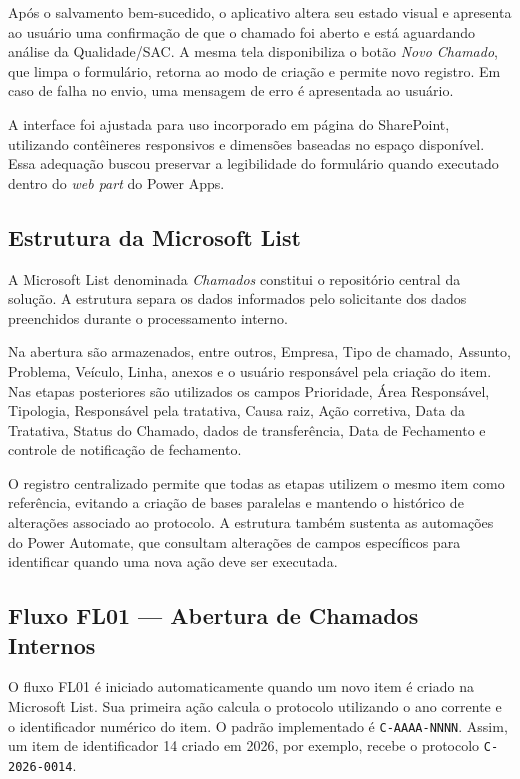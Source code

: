 Após o salvamento bem-sucedido, o aplicativo altera seu
estado visual e apresenta ao usuário uma confirmação de que
o chamado foi aberto e está aguardando análise da
Qualidade/SAC. A mesma tela disponibiliza o botão
\textit{Novo Chamado}, que limpa o formulário, retorna ao
modo de criação e permite novo registro. Em caso de falha
no envio, uma mensagem de erro é apresentada ao usuário.

A interface foi ajustada para uso incorporado em página do
SharePoint, utilizando contêineres responsivos e dimensões
baseadas no espaço disponível. Essa adequação buscou
preservar a legibilidade do formulário quando executado
dentro do \textit{web part} do Power Apps.

\subsection{Estrutura da Microsoft List}

A Microsoft List denominada \textit{Chamados} constitui o
repositório central da solução. A estrutura separa os dados
informados pelo solicitante dos dados preenchidos durante o
processamento interno.

Na abertura são armazenados, entre outros, Empresa, Tipo de
chamado, Assunto, Problema, Veículo, Linha, anexos e o
usuário responsável pela criação do item. Nas etapas
posteriores são utilizados os campos Prioridade, Área
Responsável, Tipologia, Responsável pela tratativa, Causa
raiz, Ação corretiva, Data da Tratativa, Status do Chamado,
dados de transferência, Data de Fechamento e controle de
notificação de fechamento.

O registro centralizado permite que todas as etapas
utilizem o mesmo item como referência, evitando a criação
de bases paralelas e mantendo o histórico de alterações
associado ao protocolo. A estrutura também sustenta as
automações do Power Automate, que consultam alterações de
campos específicos para identificar quando uma nova ação
deve ser executada.

\subsection{Fluxo FL01 --- Abertura de Chamados Internos}

O fluxo FL01 é iniciado automaticamente quando um novo item
é criado na Microsoft List. Sua primeira ação calcula o
protocolo utilizando o ano corrente e o identificador
numérico do item. O padrão implementado é
\texttt{C-AAAA-NNNN}. Assim, um item de identificador 14
criado em 2026, por exemplo, recebe o protocolo
\texttt{C-2026-0014}.

